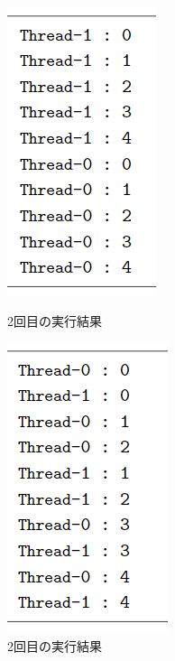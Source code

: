 \documentclass[dvipdfmx]{jsarticle}
\begin{document}
\begin{figure}[H]
  \begin{minipage}{0.5\hsize}
    \begin{center}
      \includegraphics[width=0.4\hsize]{../pic/3_1.png}
    \end{center}
    \caption{2回目の実行結果}
    \label{mt_r_1}
  \end{minipage}
  \begin{minipage}{0.5\hsize}
    \begin{center}
      \includegraphics[width=0.4\hsize]{../pic/3_2.png}
    \end{center}
    \caption{2回目の実行結果}
    \label{mt_r_2}
  \end{minipage}
\end{figure}
\end{document}
